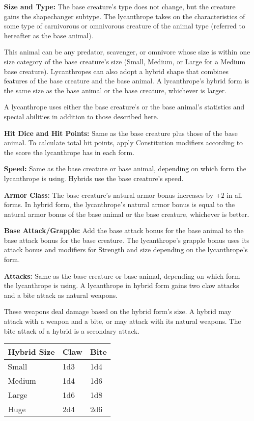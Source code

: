 \documentclass{article}
\begin{document}
\textbf{Size and Type:} The base creature's type does not change, but the creature 
gains the shapechanger subtype. The lycanthrope takes on the characteristics of 
some type of carnivorous or omnivorous creature of the animal type (referred to 
hereafter as the base animal).

This animal can be any predator, scavenger, or omnivore whose size is within one 
size category of the base creature's size (Small, Medium, or Large for a Medium 
base creature). Lycanthropes can also adopt a hybrid shape that combines features 
of the base creature and the base animal. A lycanthrope's hybrid form is the same 
size as the base animal or the base creature, whichever is larger.

A lycanthrope uses either the base creature's or the base animal's statistics and 
special abilities in addition to those described here.

\textbf{Hit Dice and Hit Points:} Same as the base creature plus those of the base 
animal. To calculate total hit points, apply Constitution modifiers according to 
the score the lycanthrope has in each form. 

\textbf{Speed:} Same as the base creature or base animal, depending on which form 
the lycanthrope is using. Hybrids use the base creature's speed.

\textbf{Armor Class:} The base creature's natural armor bonus increases by +2 in 
all forms. In hybrid form, the lycanthrope's natural armor bonus is equal to the 
natural armor bonus of the base animal or the base creature, whichever is better.

\textbf{Base Attack/Grapple:} Add the base attack bonus for the base animal to 
the base attack bonus for the base creature. The lycanthrope's grapple bonus uses 
its attack bonus and modifiers for Strength and size depending on the lycanthrope's 
form.

\textbf{Attacks: }Same as the base creature or base animal, depending on which 
form the lycanthrope is using. A lycanthrope in hybrid form gains two claw attacks 
and a bite attack as natural weapons.

These weapons deal damage based on the hybrid form's size. A hybrid may attack 
with a weapon and a bite, or may attack with its natural weapons. The bite attack 
of a hybrid is a secondary attack.

\begin{tabular}{|>{\raggedright}p{49pt}|>{\raggedright}p{21pt}|>{\raggedright}p{16pt}|}
\hline
H\textbf{ybrid Size} & C\textbf{law} & B\textbf{ite}\tabularnewline
\hline
Small & 1d3 & 1d4\tabularnewline
\hline
Medium & 1d4 & 1d6\tabularnewline
\hline
Large & 1d6 & 1d8\tabularnewline
\hline
Huge & 2d4 & 2d6\tabularnewline
\hline
\end{tabular}
\end{document}

